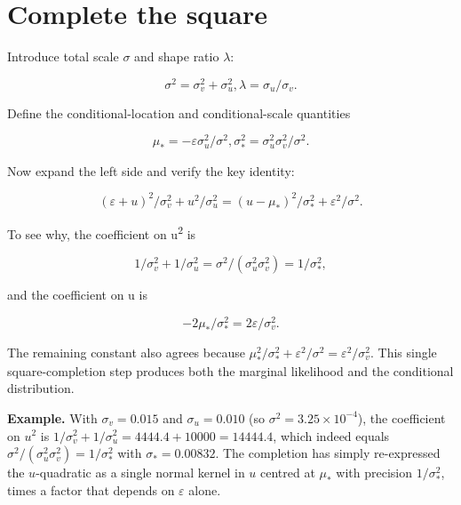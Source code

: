 \hypertarget{complete-the-square}{%
\section{Complete the square}\label{complete-the-square}}

Introduce total scale \ensuremath{\sigma } and shape ratio \ensuremath{\lambda }:

\begin{equation}
\sigma ^{2}=\sigma _{v}^{2}+\sigma _{u}^{2}, \lambda =\sigma _{u}/\sigma _{v}.
\end{equation}

Define the conditional-location and conditional-scale quantities

\begin{equation}
\mu _{*}=-\varepsilon \sigma _{u}^{2}/\sigma ^{2}, \sigma _{*}^{2}=\sigma _{u}^{2}\sigma _{v}^{2}/\sigma ^{2}.
\end{equation}

Now expand the left side and verify the key identity:

\begin{equation}
(\varepsilon +u)^{2}/\sigma _{v}^{2} + u^{2}/\sigma _{u}^{2} = (u-\mu _{*})^{2}/\sigma _{*}^{2} + \varepsilon ^{2}/\sigma ^{2}.
\end{equation}

To see why, the coefficient on u\textsuperscript{2} is

\begin{equation}
1/\sigma _{v}^{2}+1/\sigma _{u}^{2} = \sigma ^{2}/(\sigma _{u}^{2}\sigma _{v}^{2})=1/\sigma _{*}^{2},
\end{equation}

and the coefficient on u is

\begin{equation}
-2\mu _{*}/\sigma _{*}^{2} = 2\varepsilon /\sigma _{v}^{2}.
\end{equation}

The remaining constant also agrees because
$\mu_*^{2}/\sigma_*^{2}+\varepsilon^{2}/\sigma^{2}=\varepsilon^{2}/\sigma_v^{2}$.
This single square-completion step produces both the marginal likelihood
and the conditional distribution.

\textbf{Example.} With $\sigma_v=0.015$ and $\sigma_u=0.010$ (so
$\sigma^2=3.25\times10^{-4}$), the coefficient on $u^2$ is
$1/\sigma_v^2+1/\sigma_u^2 = 4444.4 + 10000 = 14444.4$, which indeed equals
$\sigma^2/(\sigma_u^2\sigma_v^2)=1/\sigma_*^2$ with $\sigma_*=0.00832$. The
completion has simply re-expressed the $u$-quadratic as a single normal
kernel in $u$ centred at $\mu_*$ with precision $1/\sigma_*^2$, times a
factor that depends on $\varepsilon$ alone.

